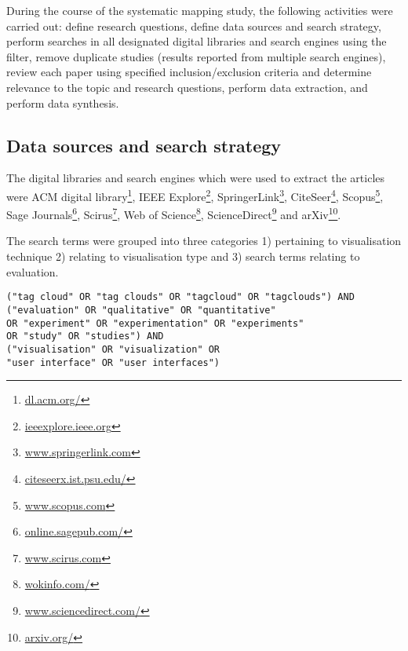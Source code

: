 During the course of the systematic mapping study, the following activities were carried out: define research questions, define data sources and search strategy, perform searches in all designated digital libraries and search engines using the filter, remove duplicate studies (results reported from multiple search engines), review each paper using specified inclusion/exclusion criteria and determine relevance to the topic and research questions, perform data extraction, and perform data synthesis.

\subsection{Data sources and search strategy}

The digital libraries and search engines which were used to extract the articles were ACM digital library\footnote{\url{dl.acm.org/}},  IEEE Explore\footnote{\url{ieeexplore.ieee.org}}, SpringerLink\footnote{\url{www.springerlink.com}}, CiteSeer\footnote{\url{citeseerx.ist.psu.edu/}}, Scopus\footnote{\url{www.scopus.com}}, Sage Journals\footnote{\url{online.sagepub.com/}}, Scirus\footnote{\url{www.scirus.com}}, Web of Science\footnote{\url{wokinfo.com/}}, ScienceDirect\footnote{\url{www.sciencedirect.com/}} and arXiv\footnote{\url{arxiv.org/}}.

The search terms were grouped into three categories 1) pertaining to visualisation technique 2) relating to visualisation type and 3) search terms relating to evaluation.

\pagebreak

\begin{verbatim}
("tag cloud" OR "tag clouds" OR "tagcloud" OR "tagclouds") AND
("evaluation" OR "qualitative" OR "quantitative"
OR "experiment" OR "experimentation" OR "experiments"
OR "study" OR "studies") AND 
("visualisation" OR "visualization" OR 
"user interface" OR "user interfaces")
\end{verbatim}

